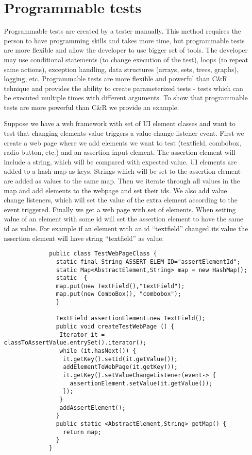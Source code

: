 		\section{Programmable tests} 
			Programmable tests are created by a tester manually. This method requires the
			person to have programming skills and takes more time, but programmable tests
			are more flexible and allow the developer to use bigger set of tools. The
			developer may use conditional statements (to change execution of the test),
			loops (to repeat same actions), exception handling, data structures (arrays,
			sets, trees, graphs), logging, etc. Programmable tests are more flexible and
			powerful than C\&R tehnique and provides the ability to create parameterized
			tests - tests which can be executed multiple times with different arguments.
			To show that programmable tests are more powerful than C\&R we provide an
			example.
			
			Suppose we have a web framework with set of UI element classes and want to
			test that changing elements value triggers a value change listener event.
			First we create a web page where we add elements we
			want to test (textfield, combobox, radio button, etc.) and an assertion input
			element. The assertion element will include a string, which will be
			compared with expected value.
			UI elements are added to a hash map as keys.
			Strings which will be set to the assertion element are added as values to the same map. Then we
			iterate through all values in the map and add elements to the webpage and set
			their ids. We also add value change listeners, which will set
			the value of the extra element according to the event triggered. Finally we
			get a web page with set of elements. When setting value of an element with
			some id will set the assertion element to have the same id as value. For
			example if an element with an id ``textfield'' changed its value the
			assertion element will have string ``textfield'' as value.
					
			\begin{lstlisting}
			 public class TestWebPageClass {
			   static final String ASSERT_ELEM_ID="assertElementId";
			   static Map<AbstractElement,String> map = new HashMap();
			   static  {
  			   map.put(new TextField(),"textField");
  			   map.put(new ComboBox(), "combobox");
			   }
			   
			   TextField assertionElement=new TextField();
			   public void createTestWebPage () {
			    Iterator it = classToAssertValue.entrySet().iterator();
			    while (it.hasNext()) {
			     it.getKey().setId(it.getValue());
			     addElementToWebPage(it.getKey());
			     it.getKey().setValueChangeListener(event-> {
			       assertionElement.setValue(it.getValue());
			     });
			    }
			    addAssertElement();
			   }  
			   public static <AbstractElement,String> getMap() {
			     return map;
			   }
			 }
			\end{lstlisting}
      
